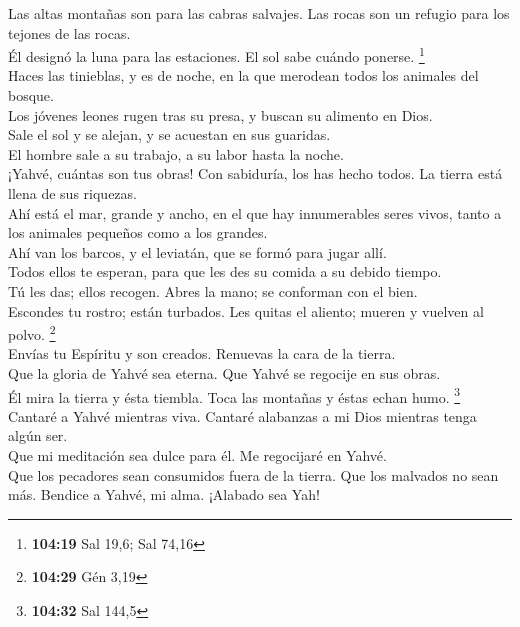  Las altas montañas son para las cabras salvajes. Las
rocas son un refugio para los tejones de las rocas.\\
 Él designó la luna para las estaciones. El sol sabe
cuándo ponerse. \footnote{\textbf{104:19} Sal 19,6; Sal 74,16}\\
 Haces las tinieblas, y es de noche, en la que merodean
todos los animales del bosque.\\
 Los jóvenes leones rugen tras su presa, y buscan su
alimento en Dios.\\
 Sale el sol y se alejan, y se acuestan en sus
guaridas.\\
 El hombre sale a su trabajo, a su labor hasta la
noche.\\
 ¡Yahvé, cuántas son tus obras! Con sabiduría, los has
hecho todos. La tierra está llena de sus riquezas.\\
 Ahí está el mar, grande y ancho, en el que hay
innumerables seres vivos, tanto a los animales pequeños como a los
grandes.\\
 Ahí van los barcos, y el leviatán, que se formó para
jugar allí.\\
 Todos ellos te esperan, para que les des su comida a su
debido tiempo.\\
 Tú les das; ellos recogen. Abres la mano; se conforman
con el bien.\\
 Escondes tu rostro; están turbados. Les quitas el
aliento; mueren y vuelven al polvo. \footnote{\textbf{104:29} Gén 3,19}\\
 Envías tu Espíritu y son creados. Renuevas la cara de la
tierra.\\
 Que la gloria de Yahvé sea eterna. Que Yahvé se regocije
en sus obras.\\
 Él mira la tierra y ésta tiembla. Toca las montañas y
éstas echan humo. \footnote{\textbf{104:32} Sal 144,5}\\
 Cantaré a Yahvé mientras viva. Cantaré alabanzas a mi
Dios mientras tenga algún ser.\\
 Que mi meditación sea dulce para él. Me regocijaré en
Yahvé.\\
 Que los pecadores sean consumidos fuera de la tierra.
Que los malvados no sean más. Bendice a Yahvé, mi alma. ¡Alabado sea
Yah!

